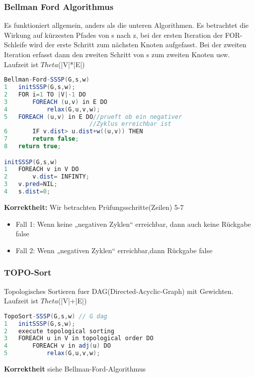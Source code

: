\documentclass[jou,apacite]{apa6}
\begin{document}
\subsubsection{Bellman Ford Algorithmus}Es funktioniert allgemein, anders als die unteren Algorithmen. Es betrachtet die Wirkung auf kürzesten Pfades von s nach z, bei der ersten Iteration der FOR-Schleife wird der erste Schritt zum nächsten Knoten aufgefasst. Bei der zweiten Iteration erfasst dann den zweiten Schritt von s zum zweiten Knoten usw. Laufzeit ist $Theta$(|V|*|E|)

\begin{lstlisting}[language=java]
Bellman-Ford-SSSP(G,s,w)
1   initSSSP(G,s,w);
2   FOR i=1 TO |V|-1 DO
3       FOREACH (u,v) in E DO
4           relax(G,u,v,w);
5   FOREACH (u,v) in E DO//prueft ob ein negativer 
                        //Zyklus erreichbar ist
6       IF v.dist> u.dist+w((u,v)) THEN
7       return false;
8   return true;

initSSSP(G,s,w)
1   FOREACH v in V DO
2       v.dist= INFINTY;
3   v.pred=NIL;
4   s.dist=0;
\end{lstlisting}

{\bfseries Korrektheit:} Wir betrachten Prüfungsschritte(Zeilen) 5-7
\begin{itemize}
    \item Fall 1: Wenn keine „negativen Zyklen“ erreichbar, dann auch keine Rückgabe false
    \item Fall 2: Wenn „negativen Zyklen“ erreichbar,dann Rückgabe false
\end{itemize}
\subsubsection{TOPO-Sort}Topologisches Sortieren fuer DAG(Directed-Acyclic-Graph) mit Gewichten. Laufzeit ist $Theta$(|V|+|E|)
\begin{lstlisting}[language =java]
TopoSort-SSSP(G,s,w) // G dag
1   initSSSP(G,s,w);
2   execute topological sorting
3   FOREACH u in V in topological order DO
4       FOREACH v in adj(u) DO
5           relax(G,u,v,w);
\end{lstlisting}

{\bfseries Korrektheit} siehe Bellman-Ford-Algorithmus
\end{document}
